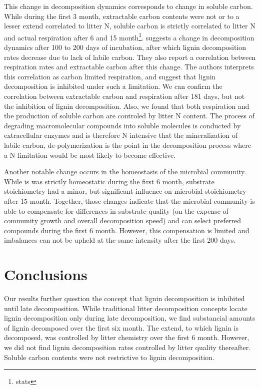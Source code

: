 \documentclass[authoryear,preprint,review,12pt]{elsarticle}
\begin{document}
This change in decomposition dynamics corresponds to change in soluble carbon. While during the first 3 month, extractable carbon contents were not or to a lesser extend correlated to litter N, soluble carbon is strictly correlated to litter N and actual respiration after 6 and 15 month\footnote{stats}. \cite{Klotzbucher2011} suggests a change in decomposition dynamics after 100 to 200 days of incubation, after which lignin decomposition rates decrease due to lack of labile carbon. They also report a correlation between respiration rates and extractable carbon after this change. The authors interprets this correlation as carbon limited respiration, and suggest that lignin decomposition is inhibited under such a limitation. We can confirm the correlation between extractable carbon and respiration after 181 days, but not the inhibition of lignin decomposition. Also, we found that both respiration and the production of soluble carbon are controled by litter N content. The process of degrading macromolecular compounds into soluble molecules is conducted by extracellular enzymes and is therefore N intensive that the mineralization of labile carbon, de-polymerization is the point in the decomposition process where a N limitation would be most likely to become effective. 

Another notable change occurs in the homeostasis of the microbial community. While is was strictly homeostatic during the first 6 month, substrate stoichiometry had a minor, but significant influence on microbial stoichiometry after 15 month. Together, those changes indicate that the microbial community is able to compensate for differences in substrate quality (on the expense of community growth and overall decomposition speed) and can select preferred compounds during the first 6 month. However, this compensation is limited and imbalances can not be upheld at the same intensity after the first 200 days. 

\section{Conclusions}

Our results further question the concept that lignin decomposition is inhibited until late decomposition. While traditional litter decomposition concepts locate lignin decomposition only during late decomposition, we find substancial amounts of lignin decomposed over the first six month. The extend, to which lignin is decomposed, was controlled by litter chemistry over the first 6 month. However, we did not find lignin decomposition rates controlled by litter quality thereafter. Soluble carbon contents were not restrictive to lignin decomposition.
\end{document}
